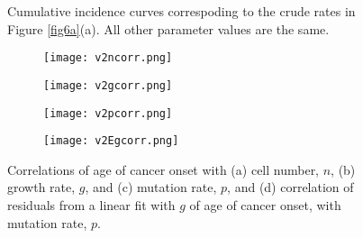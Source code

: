 \documentclass[12pt, onecolumn]{article}
\begin{document}
	\begin{figure}
		\ContinuedFloat
		\centering
		\def\svgwidth{0.7\textwidth}
		
		\caption{\label{fig6b} Cumulative incidence curves correspoding to the crude rates in Figure \ref{fig6a}(a). All other parameter values are the same.}
	\end{figure}
	
	\begin{figure}
		\centering
		\begin{subfigure}[b]{0.45\textwidth}
			\texttt{[image: v2ncorr.png]}
			\caption{\empty}
			\label{fig7a}
		\end{subfigure}
		\begin{subfigure}[b]{0.45\textwidth}
			\texttt{[image: v2gcorr.png]}
			\caption{\empty}
			\label{fig7b}
		\end{subfigure}
		\begin{subfigure}[b]{0.45\textwidth}
			\texttt{[image: v2pcorr.png]}
			\caption{\empty}
			\label{fig7c}
		\end{subfigure}
		\begin{subfigure}[b]{0.45\textwidth}
			\texttt{[image: v2Egcorr.png]}
			\caption{\empty}
			\label{fig7d}
		\end{subfigure}
		\caption{\label{fig7}Correlations of age of cancer onset with (a) cell number, $n$, (b) growth rate, $g$, and (c) mutation rate, $p$, and (d) correlation of residuals from a linear fit with $g$ of age of cancer onset, with mutation rate, $p$.}
	\end{figure}
	
%			
%			
	
\printbibliography
		
\end{document}
